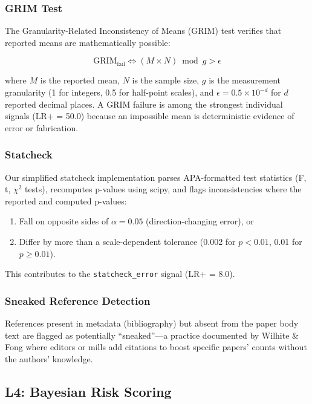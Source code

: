 \documentclass[sigconf,nonacm]{acmart}
\begin{document}
\subsubsection{GRIM Test}

The Granularity-Related Inconsistency of Means (GRIM) test \cite{brown2017grim} verifies that reported means are mathematically possible:

\begin{equation}
\text{GRIM}_\text{fail} \iff (M \times N) \bmod g > \epsilon
\label{eq:grim}
\end{equation}

\noindent where $M$ is the reported mean, $N$ is the sample size, $g$ is the measurement granularity (1 for integers, 0.5 for half-point scales), and $\epsilon = 0.5 \times 10^{-d}$ for $d$ reported decimal places.
A GRIM failure is among the strongest individual signals (LR+ = 50.0) because an impossible mean is deterministic evidence of error or fabrication.

\subsubsection{Statcheck}

Our simplified statcheck implementation parses APA-formatted test statistics (F, t, $\chi^2$ tests), recomputes p-values using scipy, and flags inconsistencies where the reported and computed p-values:
\begin{enumerate}
    \item Fall on opposite sides of $\alpha = 0.05$ (direction-changing error), or
    \item Differ by more than a scale-dependent tolerance (0.002 for $p < 0.01$, 0.01 for $p \geq 0.01$).
\end{enumerate}
This contributes to the \texttt{statcheck\_error} signal (LR+ = 8.0).

\subsubsection{Sneaked Reference Detection}

References present in metadata (bibliography) but absent from the paper body text are flagged as potentially ``sneaked''---a practice documented by Wilhite \& Fong \cite{wilhite2012} where editors or mills add citations to boost specific papers' counts without the authors' knowledge.

\subsection{L4: Bayesian Risk Scoring}
\label{sec:l4}
\end{document}
